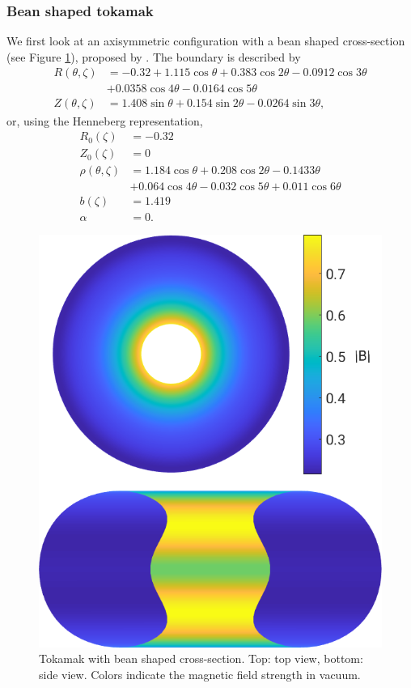 \documentclass[my_thesis.tex]{subfiles}
\begin{document}
\subsubsection{Bean shaped tokamak}
We first look at an axisymmetric configuration with a bean shaped cross-section (see Figure \ref{fig. bean shaped tokamak geometry}), proposed by \citet{hirshmanOptimizedFourierRepresentations1985}. The boundary is described by
\begin{align}
	R(\theta,\zeta) &= -0.32+1.115\cos\theta+0.383\cos 2\theta-0.0912\cos 3\theta\\
	&+0.0358\cos 4\theta-0.0164\cos 5\theta\\
	Z(\theta,\zeta) &= 1.408\sin\theta +0.154\sin 2\theta-0.0264\sin 3\theta,
\end{align}
or, using the Henneberg representation,
\begin{align}
	R_0(\zeta) &= -0.32\\
	Z_0(\zeta) &=  0\\
	\rho(\theta,\zeta) &= 1.184\cos\theta +0.208\cos 2\theta - 0.143 3\theta \\
	&+ 0.064\cos 4\theta-0.032\cos 5\theta +0.011\cos 6\theta\\
	b(\zeta) &= 1.419\\
	\alpha&=0.
\end{align}
\begin{figure}
	\centering
	\includegraphics[width=.8\linewidth]{images/HennebergRepresentation/BeanShape_modB_boundary.png}
	\caption{Tokamak with bean shaped cross-section. Top: top view, bottom: side view. Colors indicate the magnetic field strength in vacuum.}
	\label{fig. bean shaped tokamak geometry}
\end{figure}
\end{document}
